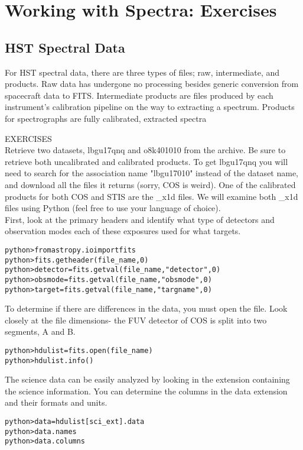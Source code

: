 \chapter{Working with Spectra: Exercises}
\label{ch:using_data}

\section{HST Spectral Data}
For HST spectral data, there are three types of files; raw, intermediate, and products.  Raw data has undergone no processing besides generic conversion from spacecraft data to FITS{\color{red}{, and include \_rawtag, \_rawaccum, and \_rawacq files for COS and \_raw, \_tag, and \_wav files for STIS}}.  Intermediate products are files produced  by each instrument's calibration pipeline on the way to extracting a spectrum. {\color{red}{There are many of these for both COS and STIS, but main ones include \_corrtag files for COS, \_crj and \_sfl for STIS, and \_flt files for both. }} Products for spectrographs are fully calibrated, extracted spectra {\color{red}{and typically end in \_x1d.fits. See the Instrument Data Handbooks for a full list of all data file types.}} 

{\color{blue} {\sf\small EXERCISES}} \\
Retrieve two datasets,  lbgu17qnq and o8k401010 from the archive. Be sure to retrieve both uncalibrated and calibrated products.  To get lbgu17qnq you will need to search for the association name "lbgu17010" instead of the dataset name, and download all the files it returns (sorry, COS is weird).  One of the calibrated products for both COS and STIS are the \_x1d files. We will examine both \_x1d files using Python (feel free to use your language of choice). {\color{red}{You will need to repeat each of these steps for both COS and STIS files.}}\\

First, look at the primary headers and identify what type of detectors and observation modes each of these exposures used for what targets.
\begin{alltt}
python> from astropy.io import fits 
python> fits.getheader(file_name, 0)
python> detector = fits.getval(file_name, "detector", 0)
python> obsmode = fits.getval(file_name, "obsmode", 0)
python> target = fits.getval(file_name, "targname", 0)
\end{alltt}

To determine if there are differences in the data, you must open the file. Look closely at the file dimensions- the FUV detector of COS is split into two segments, A and B.
\begin{alltt}
python> hdulist = fits.open(file_name)
python> hdulist.info()
\end{alltt}
The science data can be easily analyzed by looking in the extension containing the science information. You can determine the columns in the data extension and their formats and units.
\begin{alltt}
python> data = hdulist[sci_ext].data
python> data.names
python> data.columns
\end{alltt}

